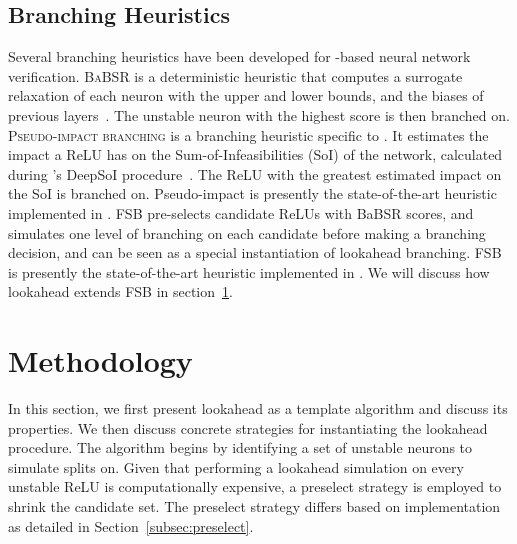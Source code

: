 \documentclass{article}
\begin{document}
\subsection{Branching Heuristics}
Several branching heuristics have been developed for \bab-based neural network verification. \textsc{BaBSR} is a deterministic heuristic that computes a surrogate relaxation of each neuron with the upper and lower bounds, and the biases of previous layers~. The unstable neuron with the highest score is then branched on. \textsc{Pseudo-impact branching} is a branching heuristic specific to \marabou. It estimates the impact a ReLU has on the Sum-of-Infeasibilities (SoI) of the network, calculated during \marabou's DeepSoI procedure~\cite{wu2022efficient}. The ReLU with the greatest estimated impact on the SoI is branched on. Pseudo-impact is presently the state-of-the-art heuristic implemented in \marabou. \textsc{FSB} pre-selects candidate ReLUs with BaBSR scores, and simulates one level of branching on each candidate before making a branching decision, and can be seen as a special instantiation of lookahead branching. FSB is presently the state-of-the-art heuristic implemented in \abcrown. We will discuss how lookahead extends FSB in section~\ref{sec:method}.

\section{Methodology}\label{sec:method}
In this section, we first present lookahead as a template algorithm and discuss its properties. We then discuss concrete strategies for instantiating the lookahead procedure. The algorithm begins by identifying a set of unstable neurons to simulate splits on. Given that performing a lookahead simulation on every unstable ReLU is computationally expensive, a preselect strategy is employed to shrink the candidate set. The preselect strategy differs based on implementation as detailed in Section~\ref{subsec:preselect}.
\end{document}
